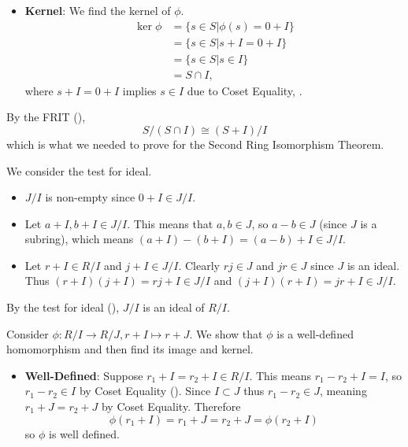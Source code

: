 \begin{questions}
\begin{partquestions}{\roman*}
\begin{itemize}
            \item \textbf{Kernel}: We find the kernel of $\phi$.
            \begin{align*}
                \ker\phi &= \{s \in S \vert \phi(s) = 0 + I\}\\
                &= \{s \in S \vert s + I = 0 + I\}\\
                &= \{s \in S \vert s \in I\}\\
                &= S \cap I,
            \end{align*}
            where $s + I = 0 + I$ implies $s \in I$ due to Coset Equality, .
        \end{itemize}
    
        By the FRIT (),
        \[
            S/(S\cap I) \cong (S+I)/I
        \]
        which is what we needed to prove for the Second Ring Isomorphism Theorem.
    \end{partquestions}

    \item \begin{partquestions}{\roman*}
        \item We consider the test for ideal.
        \begin{itemize}
            \item $J/I$ is non-empty since $0+I \in J/I$.
            \item Let $a+I,b+I \in J/I$. This means that $a,b \in J$, so $a - b \in J$ (since $J$ is a subring), which means $(a+I) - (b+I) = (a-b) + I \in J/I$.
            \item Let $r+I \in R/I$ and $j+I \in J/I$. Clearly $rj \in J$ and $jr \in J$ since $J$ is an ideal. Thus $(r+I)(j+I) = rj + I \in J/I$ and $(j+I)(r+I) = jr + I \in J/I$.
        \end{itemize}
        By the test for ideal (), $J/I$ is an ideal of $R/I$.
    
        \item Consider $\phi: R/I \to R/J, r+I\mapsto r+J$. We show that $\phi$ is a well-defined homomorphism and then find its image and kernel.
        \begin{itemize}
            \item \textbf{Well-Defined}: Suppose $r_1 + I = r_2 + I \in R/I$. This means $r_1 - r_2 + I = I$, so $r_1 - r_2 \in I$ by Coset Equality (). Since $I \subset J$ thus $r_1 - r_2 \in J$, meaning $r_1 + J = r_2 + J$ by Coset Equality. Therefore
            \[
                \phi(r_1 + I) = r_1 + J = r_2 + J = \phi(r_2 + I)
            \]
            so $\phi$ is well defined.
    

\end{itemize}
\end{partquestions}
\end{questions}
